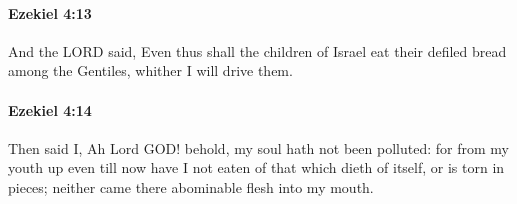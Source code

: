 		\paragraph{Ezekiel 4:13} %
			\label{EZEKIEL-4-13}

			And the LORD said, Even thus shall the children of Israel eat their defiled bread among the Gentiles, whither I will drive them.


		\paragraph{Ezekiel 4:14} %
			\label{EZEKIEL-4-14}

			Then said I, Ah Lord GOD! behold, my soul hath not been polluted: for from my youth up even till now have I not eaten of that which dieth of itself, or is torn in pieces; neither came there abominable flesh into my mouth.


